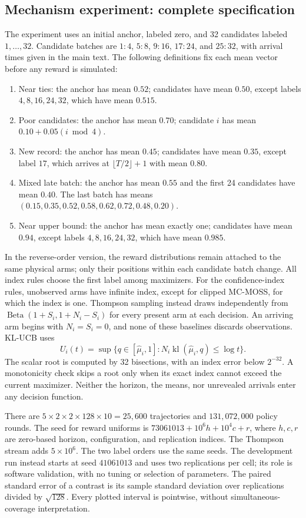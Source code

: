 \subsection{Mechanism experiment: complete specification}
\label{sec:mechanisms-details}

The experiment uses an initial anchor, labeled zero, and 32 candidates
labeled $1,\ldots,32$.  Candidate batches are $1{:}4$, $5{:}8$,
$9{:}16$, $17{:}24$, and $25{:}32$, with arrival times given in the main
text.  The following definitions fix each mean vector before any reward
is simulated:
\begin{enumerate}
\item Near ties: the anchor has mean $0.52$; candidates have mean $0.50$,
except labels $4,8,16,24,32$, which have mean $0.515$.
\item Poor candidates: the anchor has mean $0.70$; candidate $i$ has mean
$0.10+0.05(i\bmod 4)$.
\item New record: the anchor has mean $0.45$; candidates have mean $0.35$,
except label $17$, which arrives at $\lfloor T/2\rfloor+1$ with mean $0.80$.
\item Mixed late batch: the anchor has mean $0.55$ and the first 24
candidates have mean $0.40$.  The last batch has means
$(0.15,0.35,0.52,0.58,0.62,0.72,0.48,0.20)$.
\item Near upper bound: the anchor has mean exactly one; candidates have
mean $0.94$, except labels $4,8,16,24,32$, which have mean $0.985$.
\end{enumerate}
In the reverse-order version, the reward distributions remain attached
to the same physical arms; only their positions within each candidate
batch change.  All index rules choose the first label among maximizers.
For the confidence-index rules, unobserved arms have infinite index,
except for clipped MC-MOSS, for which the index is one.
Thompson sampling instead draws independently from
$\operatorname{Beta}(1+S_i,1+N_i-S_i)$ for every present arm at each
decision.  An arriving arm begins with $N_i=S_i=0$, and none of these
baselines discards observations.  KL-UCB uses
\[
 U_i(t)=\sup\{q\in[\widehat\mu_i,1]:
 N_i\operatorname{kl}(\widehat\mu_i,q)\leq\log t\}.
\]
The scalar root is computed by 32 bisections, with an index error below
$2^{-32}$.  A monotonicity check skips a root only when its exact index
cannot exceed the current maximizer.  Neither the horizon, the means,
nor unrevealed arrivals enter any decision function.

There are $5\times2\times2\times128\times10=25{,}600$ trajectories and
$131{,}072{,}000$ policy rounds.  The seed for reward uniforms is
$73061013+10^6h+10^4c+r$, where $h,c,r$ are zero-based horizon,
configuration, and replication indices.  The Thompson stream adds
$5\times10^6$.  The two label orders use the same seeds.  The development
run instead starts at seed $41061013$ and uses two replications per cell;
its role is software validation, with no tuning or selection of parameters.
The paired standard error of a contrast is its sample standard deviation
over replications divided by $\sqrt{128}$.  Every plotted interval is
pointwise, without simultaneous-coverage interpretation.

